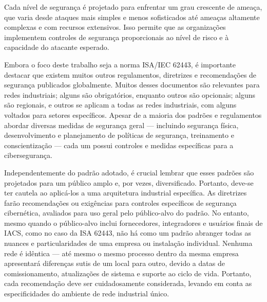         Cada nível de segurança é projetado para enfrentar um grau crescente de ameaça, que varia desde ataques mais simples e menos sofisticados até ameaças altamente complexas e com recursos extensivos. Isso permite que as organizações implementem controles de segurança proporcionais ao nível de risco e à capacidade do atacante esperado.

        Embora o foco deste trabalho seja a norma ISA/IEC 62443, é importante destacar que existem muitos outros regulamentos, diretrizes e recomendações de segurança publicados globalmente. Muitos desses documentos são relevantes para redes industriais; alguns são obrigatórios, enquanto outros são opcionais; alguns são regionais, e outros se aplicam a todas as redes industriais, com alguns voltados para setores específicos. Apesar de a maioria dos padrões e regulamentos abordar diversas medidas de segurança geral — incluindo segurança física, desenvolvimento e planejamento de políticas de segurança, treinamento e conscientização — cada um possui controles e medidas específicas para a cibersegurança.

        Independentemente do padrão adotado, é crucial lembrar que esses padrões são projetados para um público amplo e, por vezes, diversificado. Portanto, deve-se ter cautela ao aplicá-los a uma arquitetura industrial específica. As diretrizes farão recomendações ou exigências para controles específicos de segurança cibernética, avaliados para uso geral pelo público-alvo do padrão. No entanto, mesmo quando o público-alvo inclui fornecedores, integradores e usuários finais de IACS, como no caso da ISA 62443, não há como um padrão abranger todas as nuances e particularidades de uma empresa ou instalação individual. Nenhuma rede é idêntica — até mesmo o mesmo processo dentro da mesma empresa apresentará diferenças sutis de um local para outro, devido a datas de comissionamento, atualizações de sistema e suporte ao ciclo de vida. Portanto, cada recomendação deve ser cuidadosamente considerada, levando em conta as especificidades do ambiente de rede industrial único.
